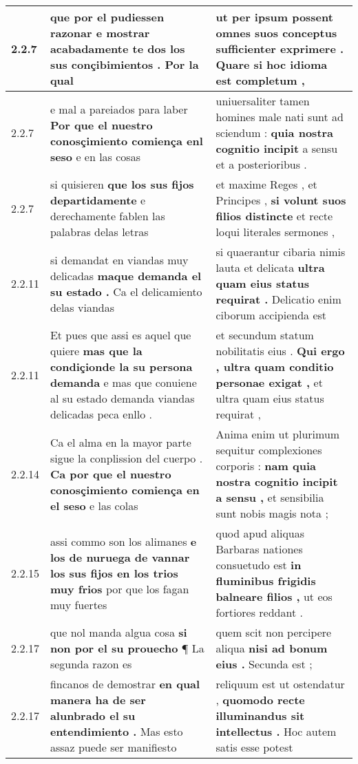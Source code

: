 \begin{tabular}{|p{1cm}|p{6.5cm}|p{6.5cm}|}
2.2.7 & que por el pudiessen razonar e mostrar \textbf{ acabadamente te dos los sus conçibimientos . } Por la qual & ut per ipsum possent omnes \textbf{ suos conceptus sufficienter exprimere . } Quare si hoc idioma est completum , \\\hline
2.2.7 & e mal a pareiados para laber \textbf{ Por que el nuestro conosçimiento comiença enl seso } e en las cosas & uniuersaliter tamen homines male nati sunt ad sciendum : \textbf{ quia nostra cognitio incipit } a sensu et a posterioribus . \\\hline
2.2.7 & si quisieren \textbf{ que los sus fijos departidamente } e derechamente fablen las palabras delas letras & et maxime Reges , et Principes , \textbf{ si volunt suos filios distincte } et recte loqui literales sermones , \\\hline
2.2.11 & si demandat en viandas muy delicadas \textbf{ maque demanda el su estado . } Ca el delicamiento delas viandas & si quaerantur cibaria nimis lauta et delicata \textbf{ ultra quam eius status requirat . } Delicatio enim ciborum accipienda est \\\hline
2.2.11 & Et pues que assi es aquel que quiere \textbf{ mas que la condiçionde la su persona demanda } e mas que conuiene al su estado demanda viandas delicadas peca enllo . & et secundum statum nobilitatis eius . \textbf{ Qui ergo , ultra quam conditio personae exigat , } et ultra quam eius status requirat , \\\hline
2.2.14 & Ca el alma en la mayor parte sigue la conplission del cuerpo . \textbf{ Ca por que el nuestro conosçimiento comiença en el seso } e las colas & Anima enim ut plurimum sequitur complexiones corporis : \textbf{ nam quia nostra cognitio incipit a sensu , } et sensibilia sunt nobis magis nota ; \\\hline
2.2.15 & assi commo son los alimanes \textbf{ e los de nuruega de vannar los sus fijos en los trios muy frios } por que los fagan muy fuertes & quod apud aliquas Barbaras nationes consuetudo est \textbf{ in fluminibus frigidis balneare filios , } ut eos fortiores reddant . \\\hline
2.2.17 & que nol manda algua cosa \textbf{ si non por el su prouecho } ¶ La segunda razon es & quem scit non percipere aliqua \textbf{ nisi ad bonum eius . } Secunda est ; \\\hline
2.2.17 & fincanos de demostrar \textbf{ en qual manera ha de ser alunbrado el su entendimiento . } Mas esto assaz puede ser manifiesto & reliquum est ut ostendatur , \textbf{ quomodo recte illuminandus sit intellectus . } Hoc autem satis esse potest \\\hline

\end{tabular}
